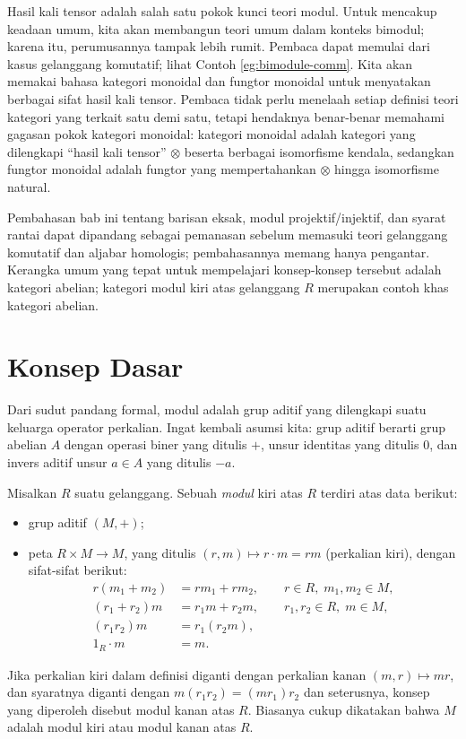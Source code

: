 \begin{wenxintishi}
	Hasil kali tensor adalah salah satu pokok kunci teori modul. Untuk mencakup keadaan umum, kita akan membangun teori umum dalam konteks bimodul; karena itu, perumusannya tampak lebih rumit. Pembaca dapat memulai dari kasus gelanggang komutatif; lihat Contoh \ref{eg:bimodule-comm}. Kita akan memakai bahasa kategori monoidal dan fungtor monoidal untuk menyatakan berbagai sifat hasil kali tensor. Pembaca tidak perlu menelaah setiap definisi teori kategori yang terkait satu demi satu, tetapi hendaknya benar-benar memahami gagasan pokok kategori monoidal: kategori monoidal adalah kategori yang dilengkapi ``hasil kali tensor'' $\otimes$ beserta berbagai isomorfisme kendala, sedangkan fungtor monoidal adalah fungtor yang mempertahankan $\otimes$ hingga isomorfisme natural.
	
	Pembahasan bab ini tentang barisan eksak, modul projektif/injektif, dan syarat rantai dapat dipandang sebagai pemanasan sebelum memasuki teori gelanggang komutatif dan aljabar homologis; pembahasannya memang hanya pengantar. Kerangka umum yang tepat untuk mempelajari konsep-konsep tersebut adalah kategori abelian; kategori modul kiri atas gelanggang $R$ merupakan contoh khas kategori abelian.
\end{wenxintishi}

\section{Konsep Dasar}
Dari sudut pandang formal, modul adalah grup aditif yang dilengkapi suatu keluarga operator perkalian. Ingat kembali asumsi kita: grup aditif berarti grup abelian $A$ dengan operasi biner yang ditulis $+$, unsur identitas yang ditulis $0$, dan invers aditif unsur $a \in A$ yang ditulis $-a$.

\begin{definition}
	Misalkan $R$ suatu gelanggang. Sebuah \emph{modul} kiri atas $R$ terdiri atas data berikut:
	\begin{itemize}
		\item grup aditif $(M, +)$;
		\item peta $R \times M \to M$, yang ditulis $(r, m) \mapsto r \cdot m = rm$ (perkalian kiri), dengan sifat-sifat berikut:
		\begin{align*}
			r(m_1 + m_2) &= rm_1 + rm_2, \qquad r \in R, \; m_1, m_2 \in M, \\
			(r_1 + r_2)m &= r_1 m + r_2 m, \qquad r_1, r_2 \in R, \; m \in M, \\
			(r_1 r_2)m & = r_1 (r_2 m), \\
			1_R \cdot m & = m.
		\end{align*}
	\end{itemize}
	Jika perkalian kiri dalam definisi diganti dengan perkalian kanan $(m, r) \mapsto mr$, dan syaratnya diganti dengan $m(r_1 r_2) = (mr_1)r_2$ dan seterusnya, konsep yang diperoleh disebut modul kanan atas $R$. Biasanya cukup dikatakan bahwa $M$ adalah modul kiri atau modul kanan atas $R$.
\end{definition}

